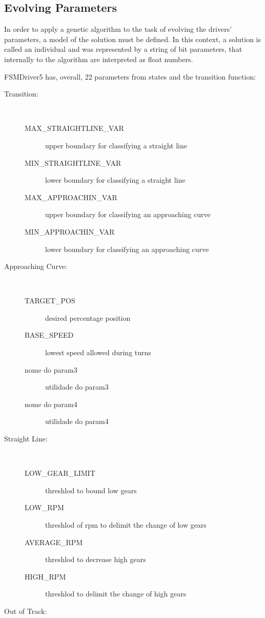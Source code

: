 \subsection{Evolving Parameters}%
In order to apply a genetic algorithm to the task of evolving the drivers' parameters, a model of the solution must be defined. In this context, a solution is called an individual and was represented by a string of bit parameters, that internally to the algorithm are interpreted as float numbers.

FSMDriver5 has, overall, 22 parameters from states and the transition function:

\begin{description}
	\item[Transition:] \ %
	\begin{description}
		\item[MAX\_STRAIGHTLINE\_VAR] upper boundary for classifying a straight line
		\item[MIN\_STRAIGHTLINE\_VAR] lower boundary for classifying a straight line
		\item[MAX\_APPROACHIN\_VAR] upper boundary for classifying an approaching curve
		\item[MIN\_APPROACHIN\_VAR] lower boundary for classifying an approaching curve
	\end{description}
	\item[Approaching Curve:] \ %
	\begin{description}
		\item[TARGET\_POS] desired percentage position
		\item[BASE\_SPEED] lowest speed allowed during turns
		\item[nome do param3] utilidade do param3
		\item[nome do param4] utilidade do param4
	\end{description}
	\item[Straight Line:] \ %
	\begin{description}
		\item[LOW\_GEAR\_LIMIT] threshlod to bound low gears
		\item[LOW\_RPM] threshlod of rpm to delimit the change of low gears
		\item[AVERAGE\_RPM] threshlod to decrease high gears
		\item[HIGH\_RPM] threshlod to delimit the change of high gears
	\end{description}
	\item[Out of Track:] \ %

\end{description}

